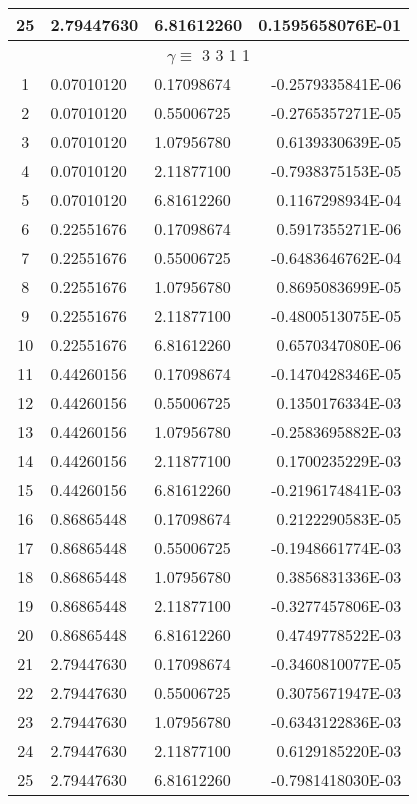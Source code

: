 \begin{longtable}{@{\extracolsep{\fill}}cllr@{}}
25  &  2.79447630  &  6.81612260  &   0.1595658076E-01 \\
\midrule
\multicolumn{4}{c}{ $\gamma \equiv $  3 3 1 1} \\
\midrule
1  &  0.07010120  &  0.17098674  &  -0.2579335841E-06 \\
2  &  0.07010120  &  0.55006725  &  -0.2765357271E-05 \\
3  &  0.07010120  &  1.07956780  &   0.6139330639E-05 \\
4  &  0.07010120  &  2.11877100  &  -0.7938375153E-05 \\
5  &  0.07010120  &  6.81612260  &   0.1167298934E-04 \\
6  &  0.22551676  &  0.17098674  &   0.5917355271E-06 \\
7  &  0.22551676  &  0.55006725  &  -0.6483646762E-04 \\
8  &  0.22551676  &  1.07956780  &   0.8695083699E-05 \\
9  &  0.22551676  &  2.11877100  &  -0.4800513075E-05 \\
10  &  0.22551676  &  6.81612260  &   0.6570347080E-06 \\
11  &  0.44260156  &  0.17098674  &  -0.1470428346E-05 \\
12  &  0.44260156  &  0.55006725  &   0.1350176334E-03 \\
13  &  0.44260156  &  1.07956780  &  -0.2583695882E-03 \\
14  &  0.44260156  &  2.11877100  &   0.1700235229E-03 \\
15  &  0.44260156  &  6.81612260  &  -0.2196174841E-03 \\
16  &  0.86865448  &  0.17098674  &   0.2122290583E-05 \\
17  &  0.86865448  &  0.55006725  &  -0.1948661774E-03 \\
18  &  0.86865448  &  1.07956780  &   0.3856831336E-03 \\
19  &  0.86865448  &  2.11877100  &  -0.3277457806E-03 \\
20  &  0.86865448  &  6.81612260  &   0.4749778522E-03 \\
21  &  2.79447630  &  0.17098674  &  -0.3460810077E-05 \\
22  &  2.79447630  &  0.55006725  &   0.3075671947E-03 \\
23  &  2.79447630  &  1.07956780  &  -0.6343122836E-03 \\
24  &  2.79447630  &  2.11877100  &   0.6129185220E-03 \\
25  &  2.79447630  &  6.81612260  &  -0.7981418030E-03 \\
\end{longtable}
